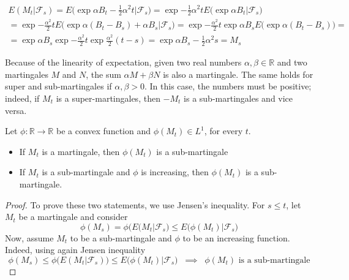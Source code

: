 \begin{enumerate}
    \begin{gather*}
        E(M_t \vert \mathcal{F}_s) = E\Big( \exp{\alpha B_t - \frac{1}{2}\alpha^2 t} \big\vert \mathcal{F}_s \Big) = \exp{-\frac{1}{2}\alpha^2 t} E\Big( \exp{\alpha B_t}  \vert \mathcal{F}_s \Big) \\
        = \exp{-\frac{\alpha^2}{2}t} E\Big( \exp{\alpha (B_t-B_s) + \alpha B_s} \big\vert \mathcal{F}_s \Big) = \exp{-\frac{\alpha^2}{2}t} \exp{\alpha B_s} E\Big( \exp{\alpha (B_t-B_s)} \Big) = \\
        = \exp{\alpha B_s} \exp{-\frac{\alpha^2}{2} t} \exp{\frac{\alpha^2}{2}(t-s) } = \exp{\alpha B_s - \frac{1}{2}\alpha^2 s} = M_s
    \end{gather*}
\end{enumerate}

Because of the linearity of expectation, given two real numbers $\alpha,\beta \in \mathbb{R}$ and two martingales $M$ and $N$, the sum $\alpha M + \beta N$ is also a martingale. The same holds for super and sub-martingales if $\alpha,\beta > 0$.
In this case, the numbers must be positive; indeed, if $M_t$ is a super-martingales, then $-M_t$ is a sub-martingales and vice versa. 

\begin{proposition}
    Let $\phi : \mathbb{R} \to \mathbb{R}$ be a convex function and $\phi(M_t) \in L^1$, for every $t$.
    \begin{itemize}
        \item If $M_t$ is a martingale, then $\phi(M_t)$ is a sub-martingale
        \item If $M_t$ is a sub-martingale and $\phi$ is increasing, then $\phi(M_t)$ is a sub-martingale.
    \end{itemize}
\end{proposition}
\begin{proof}
    To prove these two statements, we use Jensen's inequality. For $s \leq t$, let $M_t$ be a martingale and consider
    \begin{equation*}
        \phi(M_s) = \phi\Big( E(M_t \vert \mathcal{F}_s \Big) \leq E\big( \phi(M_t) \vert \mathcal{F}_s \big)
    \end{equation*}
    Now, assume $M_t$ to be a sub-martingale and $\phi$ to be an increasing function. Indeed, using again Jensen inequality
    \begin{equation*}
        \phi(M_s) \leq \phi\Big( E(M_t \vert \mathcal{F}_s) \Big) \leq E\Big( \phi(M_t) \vert \mathcal{F}_s \Big) \;\; \implies \;\; \text{$\phi(M_t)$ is a sub-martingale}
    \end{equation*}
\end{proof}

